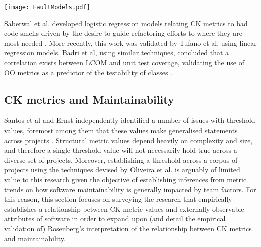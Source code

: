 \begin{table}
\begin{tabular}
 \centering 
 \texttt{[image: FaultModels.pdf]}
 \label{tab:FaultModels}
\end{tabular}
\end{table}

Saberwal et al. developed logistic regression models relating CK metrics to bad code smells driven by the desire to guide refactoring efforts to where they are most needed \citep{saberwal2013empirical}. More recently, this work was validated by Tufano et al. \citep{tufano2017and} using linear regression models. Badri et al, using similar techniques, concluded that a correlation exists between LCOM and unit test coverage, validating the use of OO metrics as a predictor of the testability of classes \citep{badri2011empirical}.

\subsection{CK metrics and Maintainability}
Santos et al and Ernst independently identified a number of issues with threshold values, foremost among them that these values make generalised statements across projects \citep{Santos2017AnES, ernst2018bayesian}. Structural metric values depend heavily on complexity and size, and therefore a single threshold value will not necessarily hold true across a diverse set of projects. Moreover, establishing a threshold across a corpus of projects using the techniques devised by Oliveira et al. is arguably of limited value to this research given the objective of establishing inferences from metric trends on how software maintainability is generally impacted by team factors. For this reason, this section focuses on surveying the research that empirically establishes a relationship between CK metric values and externally observable attributes of software in order to expand upon (and detail the empirical validation of) Rosenberg's interpretation of the relationship between CK metrics and maintainability.

